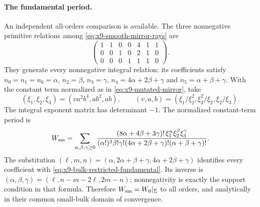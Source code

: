 \paragraph{The fundamental period.}
An independent all-orders comparison is available. The three
nonnegative primitive relations among
\eqref{eq:x9-smooth-mirror-rays} are
\begin{equation}
 \begin{pmatrix}
 1&1&0&0&4&1&1\\
 0&0&1&0&2&1&0\\
 0&0&0&1&1&1&0
 \end{pmatrix}.
 \label{eq:x9-mutated-relations}
\end{equation}
They generate every nonnegative integral relation: its coefficients
satisfy $n_0=n_1=n_6=\alpha$, $n_2=\beta$, $n_3=\gamma$,
$n_4=4\alpha+2\beta+\gamma$ and $n_5=\alpha+\beta+\gamma$.
With the constant
term normalized as in \eqref{eq:x9-mutated-mirror}, take
\begin{equation}
 (\xi_1,\xi_2,\xi_3)=(va^2b^4,ab^2,ab),\qquad
 (v,a,b)=(\xi_1/\xi_2^2,\xi_3^2/\xi_2,\xi_2/\xi_3).
 \label{eq:x9-mutated-parameters}
\end{equation}
The integral exponent matrix has determinant $-1$.
The normalized constant-term period is
\begin{equation}
 W_{\rm sm}=\sum_{\alpha,\beta,\gamma\geq0}
 \frac{(8\alpha+4\beta+3\gamma)!\,
       \xi_1^\alpha\xi_2^\beta\xi_3^\gamma}
 {(\alpha!)^3\beta!\gamma!(4\alpha+2\beta+\gamma)!
                          (\alpha+\beta+\gamma)!}.
 \label{eq:x9-mutated-period}
\end{equation}
The substitution
$(\ell,m,n)=(\alpha,2\alpha+\beta+\gamma,4\alpha+2\beta+\gamma)$
identifies every coefficient with
\eqref{eq:x9-bulk-restricted-fundamental}. Its inverse is
$(\alpha,\beta,\gamma)=(\ell,n-m-2\ell,2m-n)$; nonnegativity
is exactly the support condition in that formula. Therefore
$W_{\rm sm}=W_0|_\Sigma$ to all orders, and analytically in their
common small-bulk domain of convergence.
